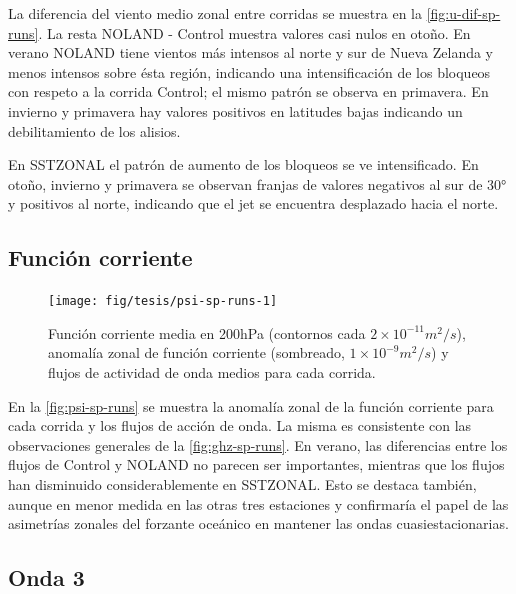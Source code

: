 \documentclass[spanish,a4paper,12pt,oneside]{book}
\begin{document}
La diferencia del viento medio zonal entre corridas se muestra en la
\autoref{fig:u-dif-sp-runs}. La resta NOLAND - Control muestra valores
casi nulos en otoño. En verano NOLAND tiene vientos más intensos al
norte y sur de Nueva Zelanda y menos intensos sobre ésta región,
indicando una intensificación de los bloqueos con respeto a la corrida
Control; el mismo patrón se observa en primavera. En invierno y
primavera hay valores positivos en latitudes bajas indicando un
debilitamiento de los alisios.

En SSTZONAL el patrón de aumento de los bloqueos se ve intensificado. En
otoño, invierno y primavera se observan franjas de valores negativos al
sur de 30° y positivos al norte, indicando que el jet se encuentra
desplazado hacia el norte.

\subsection{Función corriente}\label{funcion-corriente-3}

\begin{landscape}\begin{figure}

{\centering \texttt{[image: fig/tesis/psi-sp-runs-1]} 

}

\caption{Función corriente media en 200hPa (contornos cada $2\times10^{-11}m^2/s$), anomalía zonal de función corriente (sombreado,  $1\times10^{-9}m^2/s$) y flujos de actividad de onda medios para cada corrida.}\label{fig:psi-sp-runs}
\end{figure}
\end{landscape}

En la \autoref{fig:psi-sp-runs} se muestra la anomalía zonal de la
función corriente para cada corrida y los flujos de acción de onda. La
misma es consistente con las observaciones generales de la
\autoref{fig:ghz-sp-runs}. En verano, las diferencias entre los flujos
de Control y NOLAND no parecen ser importantes, mientras que los flujos
han disminuido considerablemente en SSTZONAL. Esto se destaca también,
aunque en menor medida en las otras tres estaciones y confirmaría el
papel de las asimetrías zonales del forzante oceánico en mantener las
ondas cuasiestacionarias.

\subsection{Onda 3}\label{onda-3-2}
\end{document}
